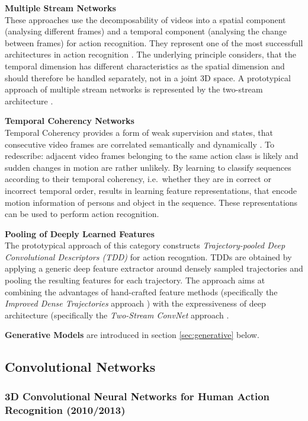 \textbf{Multiple Stream Networks}\\
These approaches use the decomposability of videos into a spatial component (analysing different frames) and a temporal component (analysing the change between frames) for action recognition.
They represent one of the most successfull architectures in action recognition \cite{wang_action_2015}.
The underlying principle considers, that the temporal dimension has different characteristics as the spatial dimension and should therefore be handled separately, not in a joint 3D space.
A prototypical approach of multiple stream networks is represented by the two-stream architecture \cite{simonyan_two-stream_2014}.

\textbf{Temporal Coherency Networks}\\
Temporal Coherency provides a form of weak supervision and states, that consecutive video frames are correlated semantically and dynamically \cite{herath_going_2016}.
To redescribe: adjacent video frames belonging to the same action class is likely and sudden changes in motion are rather unlikely.
By learning to classify sequences according to their temporal coherency, i.e.\ whether they are in correct or incorrect temporal order, results in learning feature representations, that encode motion information of persons and object in the sequence.
These representations can be used to perform action recognition.

\textbf{Pooling of Deeply Learned Features}\\
The prototypical approach of this category constructs \textit{Trajectory-pooled Deep Convolutional Descriptors (TDD)} \cite{wang_action_2015} for action recogntion.
TDDs are obtained by applying a generic deep feature extractor around densely sampled trajectories and pooling the resulting features for each trajectory.
The approach aims at combining the advantages of hand-crafted feature methods (specifically the \textit{Improved Dense Trajectories} approach \cite{wang_action_2013}) with the expressiveness of deep architecture (specifically the \textit{Two-Stream ConvNet} approach \cite{simonyan_two-stream_2014}.

\textbf{Generative Models} are introduced in section \ref{sec:generative} below.

\subsection{Convolutional Networks}

\subsubsection{3D Convolutional Neural Networks for Human Action Recognition (2010/2013)}

